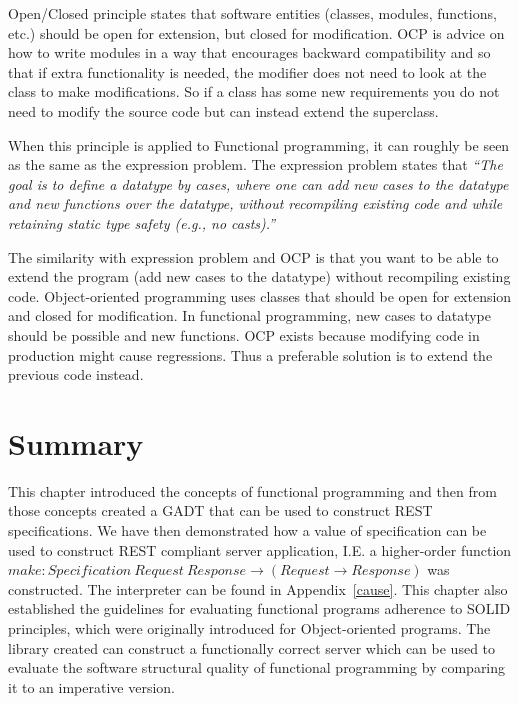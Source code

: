Open/Closed principle states that software entities (classes, modules,
functions, etc.) should be open for extension, but closed for modification. OCP
is advice on how to write modules in a way that encourages backward
compatibility and so that if extra functionality is needed, the modifier does
not need to look at the class to make modifications. So if a class has some new
requirements you do not need to modify the source code but can instead extend
the superclass.

When this principle is applied to Functional programming, it can roughly be
seen as the same as the expression problem. The expression problem states that
\textit{``The goal is to define a datatype by cases, where one can add new cases
    to the datatype and new functions over the datatype, without recompiling
existing code and while retaining static type safety (e.g., no casts).''}
~\cite{torgersen2004expression}

The similarity with expression problem and OCP is that you want to be able to
extend the program (add new cases to the datatype) without recompiling existing
code.  Object-oriented programming uses classes that should be open for
extension and closed for modification. In functional programming, new cases to
datatype should be possible and new functions. OCP exists because modifying code
in production might cause regressions. Thus a preferable solution is to extend
the previous code instead.


\section{Summary}

This chapter introduced the concepts of functional programming and then from
those concepts created a GADT that can be used to construct REST specifications.
We have then demonstrated how a value of specification can be used to construct
REST compliant server application, I.E. a higher-order function $make :
Specification\ Request\ Response \rightarrow (Request\rightarrow Response)$ was
constructed. The interpreter can be found in Appendix~\ref{cause}. This chapter
also established the guidelines for evaluating functional programs adherence to
SOLID principles, which were originally introduced for Object-oriented programs.
The library created can construct a functionally correct server which can be
used to evaluate the software structural quality of functional programming by
comparing it to an imperative version. 
